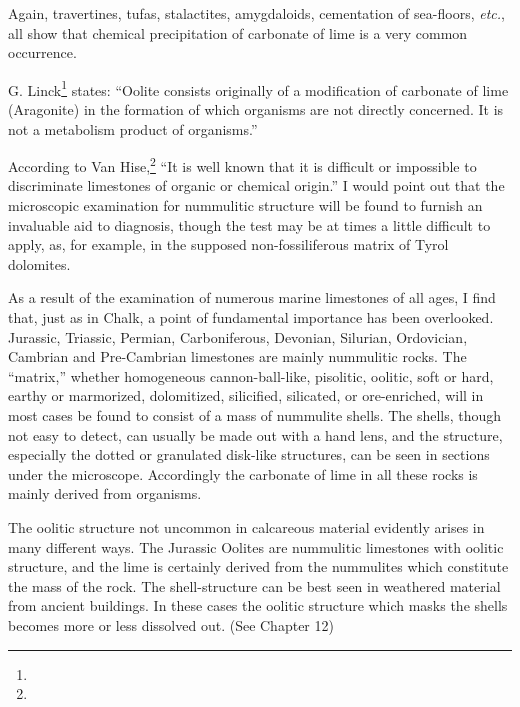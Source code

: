 \documentclass[a4paper, 12pt, oneside]{article}
\begin{document}
Again, travertines, tufas, stalactites, amygdaloids, cementation of sea-floors, \emph{etc.}, all show that chemical precipitation of carbonate of lime is a very common occurrence.

G. Linck\footnote{} states: ``Oolite consists originally of a modification of carbonate of lime (Aragonite) in the formation of which organisms are not directly concerned. It is not a metabolism product of organisms.''

According to Van Hise,\footnote{} ``It is well known that it is difficult or impossible to discriminate limestones of organic or chemical origin.'' I would point out that the microscopic examination for nummulitic structure will be found to furnish an invaluable aid to diagnosis, though the test may be at times a little difficult to apply, as, for example, in the supposed non-fossiliferous matrix of Tyrol dolomites.

As a result of the examination of numerous marine limestones of all ages, I find that, just as in Chalk, a point of fundamental importance has been overlooked. Jurassic, Triassic, Permian, Carboniferous, Devonian, Silurian, Ordovician, Cambrian and Pre-Cambrian limestones are mainly nummulitic rocks. The ``matrix,'' whether homogeneous cannon-ball-like, pisolitic, oolitic, soft or hard, earthy or marmorized, dolomitized, silicified, silicated, or ore-enriched, will in most cases be found to consist of a mass of nummulite shells. The shells, though not easy to detect, can usually be made out with a hand lens, and the structure, especially the dotted or granulated disk-like structures, can be seen in sections under the microscope. Accordingly the carbonate of lime in all these rocks is mainly derived from organisms.

The oolitic structure not uncommon in calcareous material evidently arises in many different ways. The Jurassic Oolites are nummulitic limestones with oolitic structure, and the lime is certainly derived from the nummulites which constitute the mass of the rock. The shell-structure can be best seen in weathered material from ancient buildings. In these cases the oolitic structure which masks the shells becomes more or less dissolved out. (See Chapter 12)
\end{document}
